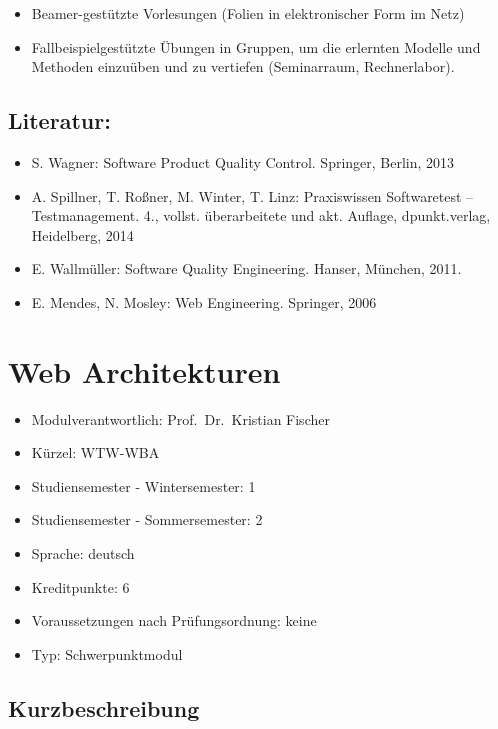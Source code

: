 \begin{itemize}
\item
  Beamer-gestützte Vorlesungen (Folien in elektronischer Form im Netz)
\item
  Fallbeispielgestützte Übungen in Gruppen, um die erlernten Modelle und
  Methoden einzuüben und zu vertiefen (Seminarraum, Rechnerlabor).
\end{itemize}

\section*{Literatur:}\label{literatur-18}

\begin{itemize}
\item
  S. Wagner: Software Product Quality Control. Springer, Berlin, 2013
\item
  A. Spillner, T. Roßner, M. Winter, T. Linz: Praxiswissen Softwaretest
  -- Testmanagement. 4., vollst. überarbeitete und akt. Auflage,
  dpunkt.verlag, Heidelberg, 2014
\item
  E. Wallmüller: Software Quality Engineering. Hanser, München, 2011.
\item
  E. Mendes, N. Mosley: Web Engineering. Springer, 2006
\end{itemize}

\chapter{Web Architekturen}\label{web-architekturen}

\begin{itemize}
\tightlist
\item
  Modulverantwortlich: Prof.~Dr.~Kristian Fischer
\item
  Kürzel: WTW-WBA
\item
  Studiensemester - Wintersemester: 1
\item
  Studiensemester - Sommersemester: 2
\item
  Sprache: deutsch
\item
  Kreditpunkte: 6
\item
  Voraussetzungen nach Prüfungsordnung: keine
\item
  Typ: Schwerpunktmodul
\end{itemize}

\section*{Kurzbeschreibung}\label{kurzbeschreibung-12}

